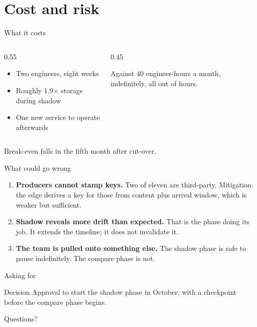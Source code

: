 \documentclass[aspectratio=169,11pt]{beamer}
\begin{document}
\section{Cost and risk}

\begin{frame}{What it costs}
  \begin{columns}[T]
    \begin{column}{0.55\textwidth}
      \begin{itemize}
        \item Two engineers, eight weeks
        \item Roughly 1.9$\times$ storage during shadow
        \item One new service to operate afterwards
      \end{itemize}
    \end{column}
    \begin{column}{0.45\textwidth}
      \begin{block}{Against}
        40 engineer-hours a month, indefinitely, all out of hours.
      \end{block}
    \end{column}
  \end{columns}

  \vspace{1em}
  Break-even falls in the fifth month after cut-over.
\end{frame}

\begin{frame}{What could go wrong}
  \begin{enumerate}
    \item \textbf{Producers cannot stamp keys.} Two of eleven are third-party.
          Mitigation: the edge derives a key for those from content plus
          arrival window, which is weaker but sufficient.
    \item \textbf{Shadow reveals more drift than expected.} That is the phase
          doing its job. It extends the timeline; it does not invalidate it.
    \item \textbf{The team is pulled onto something else.} The shadow phase is
          safe to pause indefinitely. The compare phase is not.
  \end{enumerate}
\end{frame}

\begin{frame}{Asking for}
  \begin{block}{Decision}
    Approval to start the shadow phase in October, with a checkpoint before the
    compare phase begins.
  \end{block}

  \vspace{1em}
  \centering
  \Large Questions?
\end{frame}
\end{document}

